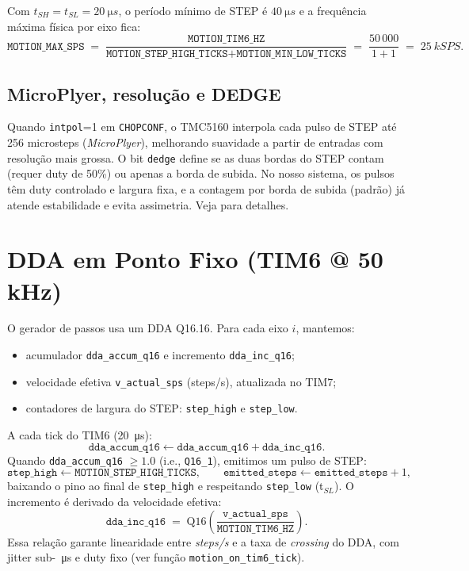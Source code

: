 \noindent
Com $t_{SH}=t_{SL}=\SI{20}{\micro s}$, o per\'iodo m\'inimo de STEP \'e $\SI{40}{\micro s}$ e a frequ\^encia m\'axima f\'isica por eixo fica:
\[
\texttt{MOTION\_MAX\_SPS} \;=\; 
\frac{\texttt{MOTION\_TIM6\_HZ}}{\texttt{MOTION\_STEP\_HIGH\_TICKS}+\texttt{MOTION\_MIN\_LOW\_TICKS}}
\;=\; \frac{50\,000}{1+1} \;=\; \SI{25}{kSPS}.
\]

\subsection{MicroPlyer, resolu\c{c}\~ao e DEDGE}
Quando \texttt{intpol}=1 em \texttt{CHOPCONF}, o TMC5160 interpola cada pulso de STEP at\'e 256 microsteps (\emph{MicroPlyer}), melhorando suavidade a partir de entradas com resolu\c{c}\~ao mais grossa. O bit \texttt{dedge} define se as duas bordas do STEP contam (requer duty de 50\%) ou apenas a borda de subida. No nosso sistema, os pulsos t\^em duty controlado e largura fixa, e a contagem por borda de subida (padr\~ao) j\'a atende estabilidade e evita assimetria. Veja \cite{tmc5160_ds} para detalhes.

\FloatBarrier
\section{DDA em Ponto Fixo (TIM6 @ 50\,kHz)}
\label{sec:dda}

O gerador de passos usa um DDA Q16.16. Para cada eixo $i$, mantemos:
\begin{itemize}
  \item acumulador \texttt{dda\_accum\_q16} e incremento \texttt{dda\_inc\_q16};
  \item velocidade efetiva \texttt{v\_actual\_sps} (steps/s), atualizada no TIM7;
  \item contadores de largura do STEP: \texttt{step\_high} e \texttt{step\_low}.
\end{itemize}
A cada tick do TIM6 (\SI{20}{\micro s}):
\[
\texttt{dda\_accum\_q16} \leftarrow \texttt{dda\_accum\_q16} + \texttt{dda\_inc\_q16}.
\]
Quando \texttt{dda\_accum\_q16} $\ge 1.0$ (i.e., \texttt{Q16\_1}), emitimos um pulso de STEP:
\[
\texttt{step\_high} \leftarrow \texttt{MOTION\_STEP\_HIGH\_TICKS},\qquad
\texttt{emitted\_steps} \leftarrow \texttt{emitted\_steps}+1,
\]
baixando o pino ao final de \texttt{step\_high} e respeitando \texttt{step\_low} (t$_{SL}$).
O incremento \'e derivado da velocidade efetiva:
\[
\texttt{dda\_inc\_q16} \;=\; \mathrm{Q16}\!\left(\frac{\texttt{v\_actual\_sps}}{\texttt{MOTION\_TIM6\_HZ}}\right).
\]
Essa rela\c{c}\~ao garante linearidade entre \emph{steps/s} e a taxa de \emph{crossing} do DDA, com jitter sub-\SI{}{\micro s} e duty fixo (ver fun\c{c}\~ao \texttt{motion\_on\_tim6\_tick}).

